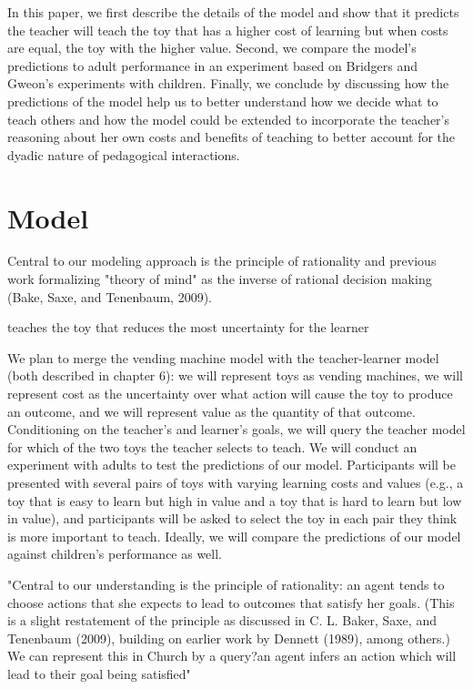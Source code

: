 \documentclass[10pt,letterpaper]{article}
\begin{document}
In this paper, we first describe the details of the model and show that it predicts the teacher will teach the toy that has a higher cost of learning but when costs are equal, the toy with the higher value. Second, we compare the model's predictions to adult performance in an experiment based on Bridgers and Gweon's experiments with children. Finally, we conclude by discussing how the predictions of the model help us to better understand how we decide what to teach others and how the model could be extended to incorporate the teacher's reasoning about her own costs and benefits of teaching to better account for the dyadic nature of pedagogical interactions.

\section{Model}

Central to our modeling approach is the principle of rationality and previous work formalizing "theory of mind" as the inverse of rational decision making (Bake, Saxe, and Tenenbaum, 2009). 

teaches the toy that reduces the most uncertainty for the learner

We plan to merge the vending machine model with the teacher-learner model (both described in chapter 6): we will represent toys as vending machines, we will represent cost as the uncertainty over what action will cause the toy to produce an outcome, and we will represent value as the quantity of that outcome. Conditioning on the teacher's and learner's goals, we will query the teacher model for which of the two toys the teacher selects to teach. We will conduct an experiment with adults to test the predictions of our model. Participants will be presented with several pairs of toys with varying learning costs and values (e.g., a toy that is easy to learn but high in value and a toy that is hard to learn but low in value), and participants will be asked to select the toy in each pair they think is more important to teach. Ideally, we will compare the predictions of our model against children's performance as well.

"Central to our understanding is the principle of rationality: an agent tends to choose actions that she expects to lead to outcomes that satisfy her goals. (This is a slight restatement of the principle as discussed in C. L. Baker, Saxe, and Tenenbaum (2009), building on earlier work by Dennett (1989), among others.) We can represent this in Church by a query?an agent infers an action which will lead to their goal being satisfied"
\end{document}
